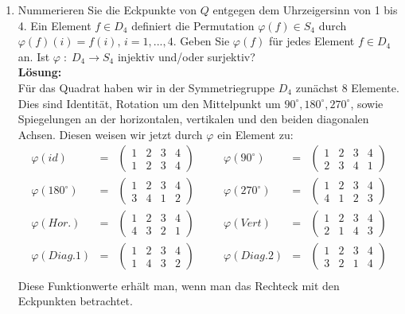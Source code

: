 \documentclass[11pt,a4paper,ngerman]{article}
\begin{document}
\begin{enumerate}[\bfseries a)]
\item Nummerieren Sie die Eckpunkte von $Q$ entgegen dem Uhrzeigersinn von 1 bis 4. Ein Element $f \in D_4$ definiert die Permutation $\varphi (f) \in S_4$ durch $\varphi (f) (i) = f(i),\, i=1,...,4$. Geben Sie $\varphi (f)$ für jedes Element $f \in D_4$ an. Ist $\varphi \; : \; D_4 \rightarrow S_4$ injektiv und/oder surjektiv?\\

\textbf{Lösung:}\\

Für das Quadrat haben wir in der Symmetriegruppe $D_4$ zunächst 8 Elemente. Dies sind Identität, Rotation um den Mittelpunkt um $90^\circ , 180^\circ , 270^\circ$, sowie Spiegelungen an der horizontalen, vertikalen und den beiden diagonalen Achsen. Diesen weisen wir jetzt durch $\varphi$ ein Element zu:\\
$$
\begin{array}{rclcrcl}
\varphi (id)	&=& \begin{pmatrix} 1 & 2 & 3 & 4 \\ 1 & 2 & 3 & 4 \end{pmatrix}& \quad &
\varphi (90^\circ) &=& \begin{pmatrix} 1 & 2 & 3 & 4 \\ 2 & 3 & 4 & 1 \end{pmatrix}\\
\varphi (180^\circ ) &=& \begin{pmatrix} 1 & 2 & 3 & 4 \\ 3 & 4 & 1 & 2 \end{pmatrix}&&
\varphi (270^\circ ) &=& \begin{pmatrix} 1 & 2 & 3 & 4 \\ 4 & 1 & 2 & 3 \end{pmatrix}\\
\varphi (Hor.) &=& \begin{pmatrix} 1 & 2 & 3 & 4 \\ 4 & 3 & 2 & 1 \end{pmatrix}&&
\varphi (Vert) &=& \begin{pmatrix} 1 & 2 & 3 & 4 \\ 2 & 1 & 4 & 3 \end{pmatrix}\\
\varphi (Diag. 1) &=& \begin{pmatrix} 1 & 2 & 3 & 4 \\ 1 & 4 & 3 & 2 \end{pmatrix}&&
\varphi (Diag. 2) &=& \begin{pmatrix} 1 & 2 & 3 & 4 \\ 3 & 2 & 1 & 4 \end{pmatrix}\\
\end{array}
$$
Diese Funktionwerte erhält man, wenn man das Rechteck mit den Eckpunkten betrachtet.\\


\end{enumerate}
\end{document}
